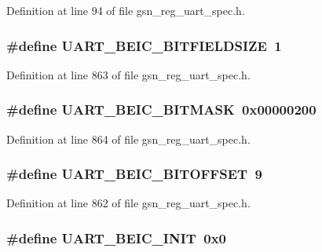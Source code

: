 Definition at line 94 of file gsn\_\-reg\_\-uart\_\-spec.h.

\hypertarget{a00575_ac54b9df8351604763558b41db2de7542}{
\subsubsection[{UART\_\-BEIC\_\-BITFIELDSIZE}]{\setlength{\rightskip}{0pt plus 5cm}\#define UART\_\-BEIC\_\-BITFIELDSIZE~1}}
\label{a00575_ac54b9df8351604763558b41db2de7542}


Definition at line 863 of file gsn\_\-reg\_\-uart\_\-spec.h.

\hypertarget{a00575_a19408d010eeb356ceadbc9a502432fde}{
\subsubsection[{UART\_\-BEIC\_\-BITMASK}]{\setlength{\rightskip}{0pt plus 5cm}\#define UART\_\-BEIC\_\-BITMASK~0x00000200}}
\label{a00575_a19408d010eeb356ceadbc9a502432fde}


Definition at line 864 of file gsn\_\-reg\_\-uart\_\-spec.h.

\hypertarget{a00575_adbd033a58f18ad5c2daa7fb505eaa813}{
\subsubsection[{UART\_\-BEIC\_\-BITOFFSET}]{\setlength{\rightskip}{0pt plus 5cm}\#define UART\_\-BEIC\_\-BITOFFSET~9}}
\label{a00575_adbd033a58f18ad5c2daa7fb505eaa813}


Definition at line 862 of file gsn\_\-reg\_\-uart\_\-spec.h.

\hypertarget{a00575_a2b4d7554b1990acf78be8df931cfbde1}{
\subsubsection[{UART\_\-BEIC\_\-INIT}]{\setlength{\rightskip}{0pt plus 5cm}\#define UART\_\-BEIC\_\-INIT~0x0}}
\label{a00575_a2b4d7554b1990acf78be8df931cfbde1}


